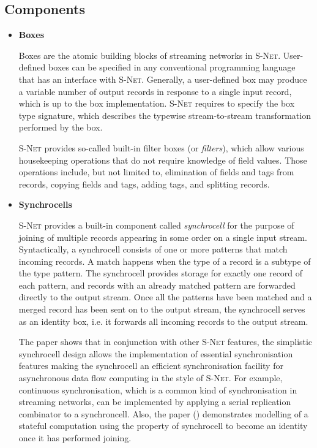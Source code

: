     \subsection*{Components}
        \begin{itemize}
        \item \textbf{Boxes}

Boxes are the atomic building blocks of streaming networks in \textsc{S-Net}. User-defined boxes can be specified in any conventional programming language that has an interface with \textsc{S-Net}. Generally, a user-defined box may produce a variable number of output records in response to a single input record, which is up to the box implementation. \textsc{S-Net} requires to specify the box type signature, which describes the typewise stream-to-stream transformation performed by the box.

\textsc{S-Net} provides so-called built-in filter boxes (or \emph{filters}), which allow various housekeeping operations that do not require knowledge of field values. Those operations include, but not limited to, elimination of fields and tags from records, copying fields and tags, adding tags, and splitting records.

        \item \textbf{Synchrocells}

\textsc{S-Net} provides a built-in component called \emph{synchrocell} for the purpose of joining of multiple records appearing in some order on a single input stream. Syntactically, a synchrocell consists of one or more patterns that match incoming records. A match happens when the type of a record is a subtype of the type pattern. The synchrocell provides storage for exactly one record of each pattern, and records with an already matched pattern are forwarded directly to the output stream. Once all the patterns have been matched and a merged record has been sent on to the output stream, the synchrocell serves as an identity box, i.e. it forwards all incoming records to the output stream.

The paper \cite{ess_sync} shows that in conjunction with other \textsc{S-Net} features, the simplistic synchrocell design allows the implementation of essential synchronisation features making the synchrocell an efficient synchronisation facility for asynchronous data flow computing in the style of \textsc{S-Net}. For example, continuous synchronisation, which is a common kind of synchronisation in streaming networks, can be implemented by applying a serial replication combinator to a synchroncell. Also, the paper (\cite{ess_sync}) demonstrates modelling of a stateful computation using the property of synchrocell to become an identity once it has performed joining.

        \end{itemize}


